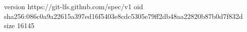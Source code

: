 version https://git-lfs.github.com/spec/v1
oid sha256:086c0a9a22615a397ed16f5403e8cdc5305e79ff2db48aa22820b87b0d7f832d
size 16145
